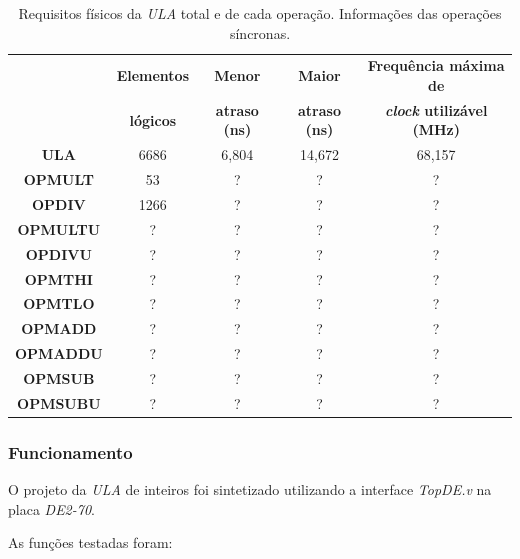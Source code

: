\documentclass[12pt]{article}
\begin{document}
\begin{table}[H]
	\centering
	\begin{tabular}{|c|c|c|c|c|}
		\hline
		& \textbf{Elementos} & \textbf{Menor} & \textbf{Maior} & \textbf{Frequência máxima de} \\
		& \textbf{lógicos} & \textbf{atraso (ns)} &  \textbf{atraso (ns)} & \textbf{\textit{clock} utilizável (MHz)} \\
		\hline
		\textbf{ULA} & 6686 & 6,804 & 14,672 &  68,157 \\\hline
		\textbf{OPMULT} & 53 & ? & ? & ? \\\hline
		\textbf{OPDIV} & 1266 & ? & ? & ? \\\hline
		\textbf{OPMULTU} & ? & ? & ? & ? \\\hline
		\textbf{OPDIVU} & ? & ? & ? & ? \\\hline
		\textbf{OPMTHI} & ? & ? & ? & ? \\\hline
		\textbf{OPMTLO} & ? & ? & ? & ? \\\hline
		\textbf{OPMADD} & ? & ? & ? & ? \\\hline
		\textbf{OPMADDU} & ? & ? & ? & ? \\\hline
		\textbf{OPMSUB} & ? & ? & ? & ? \\\hline
		\textbf{OPMSUBU}  & ? & ? & ? & ? \\\hline
	\end{tabular}
	\caption{Requisitos físicos da \textit{ULA} total e de cada operação. Informações das operações síncronas.}
	\label{tab:req22}
\end{table}

\subsubsection{Funcionamento}
\label{subsubsec:ulafunc}

O projeto da \textit{ULA} de inteiros foi sintetizado utilizando a interface \textit{TopDE.v} na placa \textit{DE2-70}.

As funções testadas foram:
\end{document}
